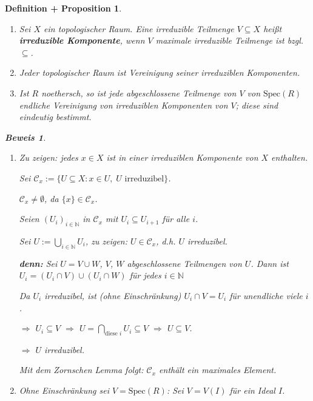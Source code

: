 \documentclass[a4paper,12pt]{scrbook}
\theoremstyle{break}
\newtheorem{DefProp}[Def]{Definition + Proposition}
\theoremstyle{nonumberbreak}
\newtheorem{Bew}{Beweis}
\theoremstyle{nonumberplain}
\newcommand{\emp}[1]{\textbf{\emph{#1}}}
\begin{document}
\begin{DefProp}
\begin{enumerate}
\item[a)] Sei $X$ ein topologischer Raum. Eine irreduzible Teilmenge $V \subseteq X$ heißt \emp{irreduzible Komponente}, wenn $V$ maximale irreduzible Teilmenge ist bzgl. $\subseteq$.

\item[b)] Jeder topologischer Raum ist Vereinigung seiner irreduziblen Komponenten.

\item[c)] Ist $R$ noethersch, so ist jede abgeschlossene Teilmenge von $V$ von $\textrm{Spec}(R)$ endliche Vereinigung von irreduziblen Komponenten von $V$; diese sind eindeutig bestimmt.

\end{enumerate}

\begin{Bew}
\begin{enumerate}

\item[b)] Zu zeigen: jedes $x \in X$ ist in einer irreduziblen Komponente von $X$ enthalten.

Sei $\mathcal{C}_x := \{ U \subseteq X : x \in U,\; U \text{ irreduzibel} \}$.

$\mathcal{C}_x \neq \emptyset$, da $\{ x \} \in \mathcal{C}_x$.

Seien $(U_i)_{i \in \mathbb{N}}$ in $\mathcal{C}_x$ mit $U_i \subseteq U_{i+1}$ für alle $i$.

Sei $U := \bigcup_{i \in \mathbb{N}} U_i$, zu zeigen: $U \in \mathcal{C}_x$, d.h. $U$ irreduzibel.

\textbf{denn:} Sei $U = V \cup W$, $V$, $W$ abgeschlossene Teilmengen von $U$. Dann ist $U_i = (U_i \cap V) \cup (U_i \cap W)$ für jedes $i \in \mathbb{N}$

Da $U_i$ irreduzibel, ist (ohne Einschränkung) $U_i \cap V = U_i$ für unendliche viele $i$.

$\Rightarrow$ $U_i \subseteq V$ $\Rightarrow$ $U = \bigcap_{\text{diese }i} U_i \subseteq V$ $\Rightarrow$ $U \subseteq V$.

$\Rightarrow$ $U$ irreduzibel.

Mit dem Zornschen Lemma folgt: $\mathcal{C}_x$ enthält ein maximales Element.

\item[c)] Ohne Einschränkung sei $V = \textrm{Spec}(R)$: Sei $V = V(I)$ für ein Ideal $I$.


\end{enumerate}
\end{Bew}
\end{DefProp}
\end{document}
